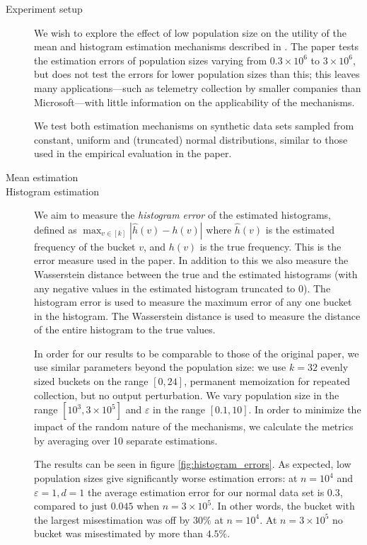 \documentclass[12pt]{article}
\renewcommand{\epsilon}{\varepsilon}
\begin{document}
\begin{description}
    \item[Experiment setup] We wish to explore the effect of low population size on the utility of the mean and histogram estimation mechanisms described in \cite{microsoft_telemetry}. The paper tests the estimation errors of population sizes varying from $0.3\times10^6$ to $3\times10^6$, but does not test the errors for lower population sizes than this; this leaves many applications---such as telemetry collection by smaller companies than Microsoft---with little information on the applicability of the mechanisms.
    
    We test both estimation mechanisms on synthetic data sets sampled from constant, uniform and (truncated) normal distributions, similar to those used in the empirical evaluation in the paper.
    
    \item[Mean estimation]
    
    \item[Histogram estimation]
    We aim to measure the \emph{histogram error} of the estimated histograms, defined as $\max_{v\in[k]} |\hat{h}(v)-h(v)|$ where $\hat{h}(v)$ is the estimated frequency of the bucket $v$, and $h(v)$ is the true frequency. This is the error measure used in the paper. In addition to this we also measure the Wasserstein distance between the true and the estimated histograms (with any negative values in the estimated histogram truncated to 0). The histogram error is used to measure the maximum error of any one bucket in the histogram. The Wasserstein distance is used to measure the distance of the entire histogram to the true values.
    
    In order for our results to be comparable to those of the original paper, we use similar parameters beyond the population size: we use $k=32$ evenly sized buckets on the range $[0,24]$, permanent memoization for repeated collection, but no output perturbation. We vary population size in the range $[10^3, 3\times10^5]$ and $\epsilon$ in the range $[0.1, 10]$. In order to minimize the impact of the random nature of the mechanisms, we calculate the metrics by averaging over 10 separate estimations.
    
    The results can be seen in figure \ref{fig:histogram_errors}. As expected, low population sizes give significantly worse estimation errors: at $n=10^4$ and $\epsilon=1, d=1$ the average estimation error for our normal data set is $0.3$, compared to just $0.045$ when $n=3\times10^5$. In other words, the bucket with the largest misestimation was off by $30\%$ at $n=10^4$. At $n=3\times10^5$ no bucket was misestimated by more than $4.5\%$.
    

\end{description}
\end{document}
